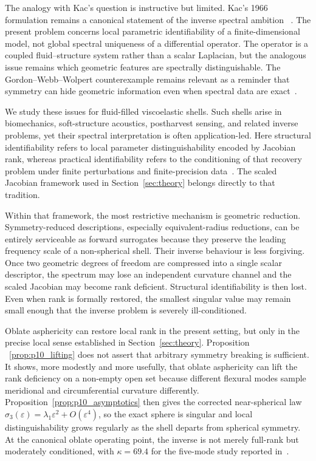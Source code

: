 The analogy with Kac's question is instructive but limited.  Kac's 1966
formulation remains a canonical statement of the inverse spectral ambition
~\cite{Kac1966}.  The present problem concerns local parametric identifiability
of a finite-dimensional model, not global spectral uniqueness of a differential
operator.  The operator is a coupled fluid--structure system rather than a
scalar Laplacian, but the analogous issue remains which geometric features are
spectrally distinguishable.  The Gordon--Webb--Wolpert counterexample remains
relevant as a reminder that symmetry can hide geometric information even when
spectral data are exact~\cite{Gordon1992}.

We study these issues for fluid-filled viscoelastic shells.  Such shells arise
in biomechanics, soft-structure acoustics, postharvest sensing, and related
inverse problems, yet their spectral interpretation is often application-led.
Here structural identifiability refers to local parameter distinguishability
encoded by Jacobian rank, whereas practical identifiability refers to the
conditioning of that recovery problem under finite perturbations and
finite-precision data~\cite{Raue2009,Doyley2012}.  The scaled Jacobian
framework used in Section~\ref{sec:theory} belongs directly to that tradition.

Within that framework, the most restrictive mechanism is geometric reduction.
Symmetry-reduced descriptions, especially equivalent-radius reductions, can be
entirely serviceable as forward surrogates because they preserve the leading
frequency scale of a non-spherical shell.  Their inverse behaviour is less
forgiving.  Once two geometric degrees of freedom are compressed into a single
scalar descriptor, the spectrum may lose an independent curvature channel and
the scaled Jacobian may become rank deficient.  Structural identifiability is
then lost.  Even when rank is formally restored, the smallest singular value
may remain small enough that the inverse problem is severely ill-conditioned.

Oblate asphericity can restore local rank in the present setting, but only
in the precise local sense established in Section~\ref{sec:theory}.  Proposition
~\ref{prop:p10_lifting} does not assert that arbitrary symmetry breaking is
sufficient.  It shows, more modestly and more usefully, that oblate
asphericity can lift the rank deficiency on a non-empty open set because
different flexural modes sample meridional and circumferential curvature
differently.  Proposition~\ref{prop:p10_asymptotics} then gives the corrected
near-spherical law $\sigma_3(\varepsilon)=\lambda_1\varepsilon^2+O(\varepsilon^4)$,
so the exact sphere is singular and local distinguishability grows regularly as
the shell departs from spherical symmetry.  At the canonical oblate operating
point, the inverse is not merely full-rank but moderately conditioned, with
$\kappa=69.4$ for the five-mode study reported in~\cite{BrowntoneP8}.

